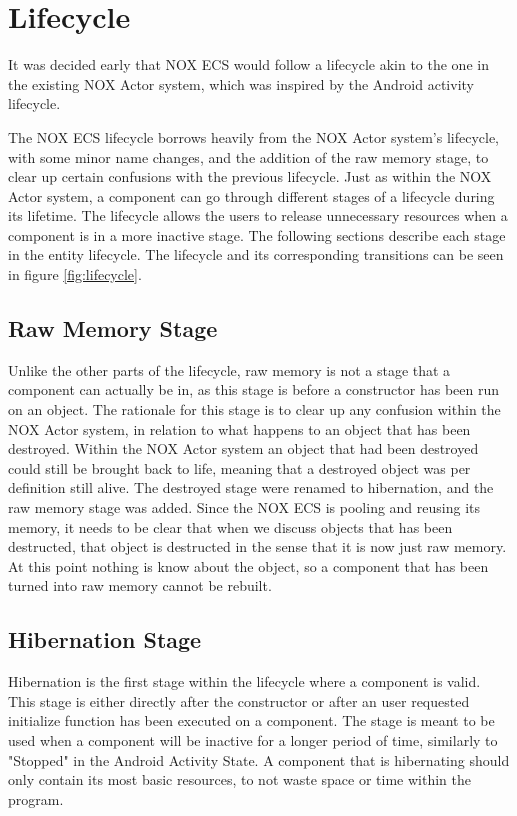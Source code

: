 \section{Lifecycle}
\label{subsec:high_level_lifecycle}
It was decided early that NOX ECS would follow a lifecycle akin to the one in the existing NOX Actor system,
which was inspired by the Android activity lifecycle\cite{android_activity_lifecycle}.

The NOX ECS lifecycle borrows heavily from the NOX Actor system's lifecycle, with some minor name changes,
and the addition of the raw memory stage, to clear up certain confusions with the previous lifecycle.
Just as within the NOX Actor system, a component can go through different stages of a lifecycle during its lifetime.
The lifecycle allows the users to release unnecessary resources when a component is in a more inactive stage.
The following sections describe each stage in the entity lifecycle.
The lifecycle and its corresponding transitions can be seen in figure \ref{fig:lifecycle}.

\subsection{Raw Memory Stage}
Unlike the other parts of the lifecycle, raw memory is not a stage that a component can actually be in,
as this stage is before a constructor has been run on an object.
The rationale for this stage is to clear up any confusion within the NOX Actor system,
in relation to what happens to an object that has been destroyed.
Within the NOX Actor system an object that had been destroyed could still be brought back to life,
meaning that a destroyed object was per definition still alive.
The destroyed stage were renamed to hibernation, and the raw memory stage was added.
Since the NOX ECS is pooling and reusing its memory, it needs to be clear that when we discuss objects
that has been destructed, that object is destructed in the sense that it is now just raw memory.
At this point nothing is know about the object, so a component that has been turned into raw memory cannot be rebuilt.

\subsection{Hibernation Stage}
Hibernation is the first stage within the lifecycle where a component is valid.
This stage is either directly after the constructor or after an user requested initialize function has been executed on a component.
The stage is meant to be used when a component will be inactive for a longer period of time, similarly to "Stopped" in the Android Activity State\cite[Activity state and ejection from memory]{android_activity_lifecycle}.
A component that is hibernating should only contain its most basic resources, to not waste space or time within the program.

